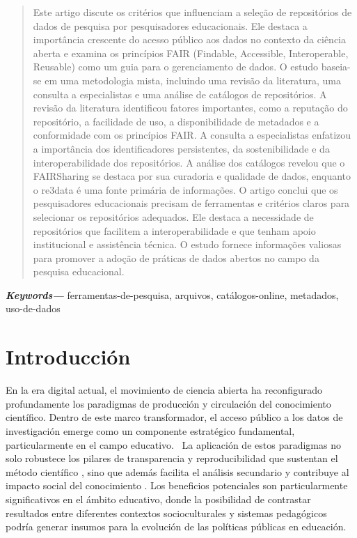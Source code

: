 \documentclass[runningheads]{llncs}
\providecommand{\keywords}[1]
{
  \small	
  \textbf{\textit{Keywords---}} #1
}
\begin{document}
\begin{abstract}
Este artigo discute os critérios que influenciam a seleção de repositórios de dados de pesquisa por pesquisadores educacionais. Ele destaca a importância crescente do acesso público aos dados no contexto da ciência aberta e examina os princípios FAIR (Findable, Accessible, Interoperable, Reusable) como um guia para o gerenciamento de dados. O estudo baseia-se em uma metodologia mista, incluindo uma revisão da literatura, uma consulta a especialistas e uma análise de catálogos de repositórios.
A revisão da literatura identificou fatores importantes, como a reputação do repositório, a facilidade de uso, a disponibilidade de metadados e a conformidade com os princípios FAIR. A consulta a especialistas enfatizou a importância dos identificadores persistentes, da sostenibilidade e da interoperabilidade dos repositórios. A análise dos catálogos revelou que o FAIRSharing se destaca por sua curadoria e qualidade de dados, enquanto o re3data é uma fonte primária de informações.
O artigo conclui que os pesquisadores educacionais precisam de ferramentas e critérios claros para selecionar os repositórios adequados. Ele destaca a necessidade de repositórios que facilitem a interoperabilidade e que tenham apoio institucional e assistência técnica. O estudo fornece informações valiosas para promover a adoção de práticas de dados abertos no campo da pesquisa educacional.
\end{abstract}
\keywords{ferramentas-de-pesquisa, arquivos, catálogos-online, metadados, uso-de-dados}

\section{Introducción}
\label{intro}
En la era digital actual, el movimiento de ciencia abierta ha reconfigurado profundamente los paradigmas de producción y circulación del conocimiento científico. Dentro de este marco transformador, el acceso público a los datos de investigación emerge como un componente estratégico fundamental, particularmente en el campo educativo. \  La aplicación de estos paradigmas no solo robustece los pilares de transparencia y reproducibilidad que sustentan el método científico \cite{oecd2020}, sino que además facilita el análisis secundario y contribuye al impacto social del conocimiento \citep{ec2016, wilkinson2016}. Los beneficios potenciales son particularmente significativos en el ámbito educativo, donde la posibilidad de contrastar resultados entre diferentes contextos socioculturales y sistemas pedagógicos podría generar insumos para la evolución de las políticas públicas en educación. 
\end{document}
